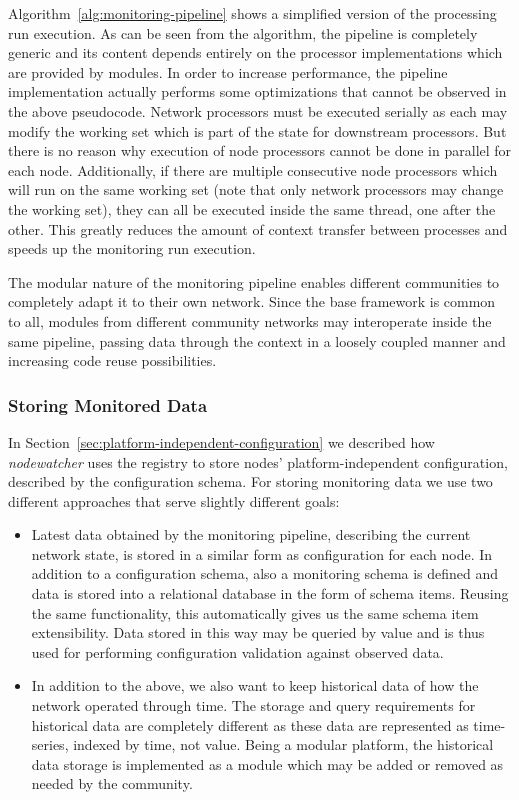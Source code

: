 \documentclass[5p,sort&compress]{elsarticle}
\newcommand{\nodewatcher}{\textit{nodewatcher}}
\begin{document}
Algorithm~\ref{alg:monitoring-pipeline} shows a simplified version of the processing run execution.
As can be seen from the algorithm, the pipeline is completely generic and its content depends entirely on the processor implementations which are provided by modules.
In order to increase performance, the pipeline implementation actually performs some optimizations that cannot be observed in the above pseudocode.
Network processors must be executed serially as each may modify the working set which is part of the state for downstream processors.
But there is no reason why execution of node processors cannot be done in parallel for each node.
Additionally, if there are multiple consecutive node processors which will run on the same working set (note that only network processors may change the working set), they can all be executed inside the same thread, one after the other.
This greatly reduces the amount of context transfer between processes and speeds up the monitoring run execution.

The modular nature of the monitoring pipeline enables different communities to completely adapt it to their own network.
Since the base framework is common to all, modules from different community networks may interoperate inside the same pipeline, passing data through the context in a loosely coupled manner and increasing code reuse possibilities.

\subsubsection{Storing Monitored Data}

In Section~\ref{sec:platform-independent-configuration} we described how \nodewatcher{} uses the registry to store nodes' platform-independent configuration, described by the configuration schema.
For storing monitoring data we use two different approaches that serve slightly different goals:
\begin{itemize}
\item Latest data obtained by the monitoring pipeline, describing the current network state, is stored in a similar form as configuration for each node.
In addition to a configuration schema, also a monitoring schema is defined and data is stored into a relational database in the form of schema items.
Reusing the same functionality, this automatically gives us the same schema item extensibility.
Data stored in this way may be queried by value and is thus used for performing configuration validation against observed data.

\item In addition to the above, we also want to keep historical data of how the network operated through time.
The storage and query requirements for historical data are completely different as these data are represented as time-series, indexed by time, not value.
Being a modular platform, the historical data storage is implemented as a module which may be added or removed as needed by the community.
\end{itemize}
\end{document}
